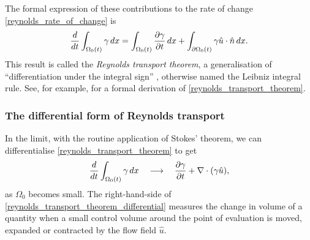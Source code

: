 The formal expression of these contributions to the rate of change \eqref{reynolds_rate_of_change} is
\begin{equation}\label{reynolds_transport_theorem}
    \frac{d}{dt}\int_{\Omega_0(t)}\gamma\,dx = 
        \int_{\Omega_0(t)}\frac{\partial \gamma}{\partial t}\,dx + \int_{\partial\Omega_0(t)}\gamma \hat{u}\cdot\hat{n} \,dx.
\end{equation}
This result is called the \textit{Reynolds transport theorem},
a generalisation of ``differentiation under the integral sign'' \cite{feynman_trick},
otherwise named the Leibniz integral rule. See, for example, \cite{leal} for a formal derivation of \eqref{reynolds_transport_theorem}.
\subsubsection{The differential form of Reynolds transport}
 In the limit, with the routine application of Stokes' theorem, we can differentialise \eqref{reynolds_transport_theorem}
to get
\begin{equation}\label{reynolds_transport_theorem_differential}
    \frac{d}{dt}\int_{\Omega_0(t)}\gamma\,dx \quad\longrightarrow\quad \frac{\partial \gamma}{\partial t} + \nabla \cdot(\gamma \hat{u}),
\end{equation}
as $\Omega_0$ becomes small.
The right-hand-side of \eqref{reynolds_transport_theorem_differential} measures
the change in volume of a quantity when a small control volume around the point of evaluation is moved, expanded or contracted by the flow field $\hat{u}$.

